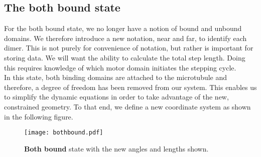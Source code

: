 		 
		\subsection{The both bound state}
		For the both bound state, we no longer have a notion of bound and unbound domains. We therefore introduce a new notation, near and far, to identify each dimer. This is not purely for convenience of notation, but rather is important for storing data. We will want the ability to calculate the total step length. Doing this requires knowledge of which motor domain initiates the stepping cycle. \\
		
		In this state, both binding domains are attached to the microtubule and therefore, a degree of freedom has been removed from our system. This enables us to simplify the dynamic equations in order to take advantage of the new, constrained geometry. To that end, we define a new coordinate system as shown in the following figure. 
		
		\begin{figure}[!hbt]
			\centering
			\texttt{[image: bothbound.pdf]}
			\caption{\textbf{Both bound} state with the new angles and lengths shown.}
			\label{fig:bothbound}
		\end{figure}
		
